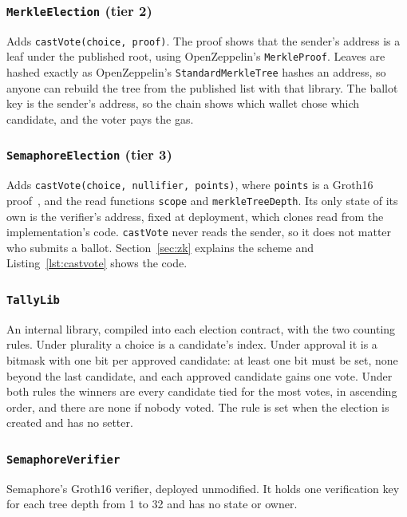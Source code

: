 \subsubsection*{\texttt{MerkleElection} (tier 2)}

Adds \texttt{castVote(choice, proof)}. The proof shows that the sender's
address is a leaf under the published root, using OpenZeppelin's
\texttt{MerkleProof}. Leaves are hashed exactly as OpenZeppelin's
\texttt{StandardMerkleTree} hashes an address, so anyone can rebuild the tree
from the published list with that library. The ballot key is the sender's
address, so the chain shows which wallet chose which candidate, and the voter
pays the gas.

\subsubsection*{\texttt{SemaphoreElection} (tier 3)}

Adds \texttt{castVote(choice, nullifier, points)}, where \texttt{points} is a
Groth16 proof~\cite{groth16}, and the read functions \texttt{scope} and
\texttt{merkleTreeDepth}. Its only state of its own is the verifier's address,
fixed at deployment, which clones read from the implementation's code.
\texttt{castVote} never reads the sender, so it does not matter who submits a
ballot.
Section~\ref{sec:zk} explains the scheme and Listing~\ref{lst:castvote} shows
the code.

\subsubsection*{\texttt{TallyLib}}

An internal library, compiled into each election contract, with the two
counting rules. Under plurality a choice is a candidate's index. Under approval
it is a bitmask with one bit per approved candidate: at least one bit must be
set, none beyond the last candidate, and each approved candidate gains one
vote. Under both rules the winners are every candidate tied for the most
votes, in ascending order, and there are none if nobody voted. The rule is set
when the election is created and has no setter.

\subsubsection*{\texttt{SemaphoreVerifier}}

Semaphore's Groth16 verifier, deployed unmodified. It holds one verification key for each
tree depth from 1 to 32 and has no state or owner.

